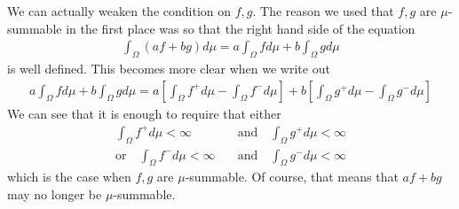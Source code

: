 \begin{rem}[]
  We can actually weaken the condition on $f,g$.
  The reason we used that $f,g$ are $\mu$-summable in the first place was so that the right hand side of the equation
  \begin{align*}
    \int_{\Omega} (af + bg) d \mu = a \int_{\Omega} f d \mu + b \int_{\Omega} g d \mu
  \end{align*}
  is well defined. This becomes more clear when we write out 
      \begin{align*}
        a \int_{\Omega} f d \mu + b \int_{\Omega} g d \mu
        =
        a\left[
          \int_{\Omega} f^{+} d \mu
          - \int_{\Omega} f^{-} d \mu
        \right]
        + b \left[
          \int_{\Omega} g^{+} d \mu
          - \int_{\Omega} g^{-} d \mu
        \right]
      \end{align*}
      We can see that it is enough to require that either
      \begin{align*}
        \int_{\Omega} f^{+} d \mu < \infty \quad &\text{and} \quad  
        \int_{\Omega} g^{+} d \mu < \infty\\
        \text{or}\quad
        \int_{\Omega} f^{-} d \mu < \infty \quad &\text{and} \quad  
        \int_{\Omega} g^{-} d \mu < \infty
      \end{align*}
      which is the case when $f,g$ are $\mu$-summable.
      Of course, that means that $af + bg$ may no longer be $\mu$-summable.
\end{rem}


